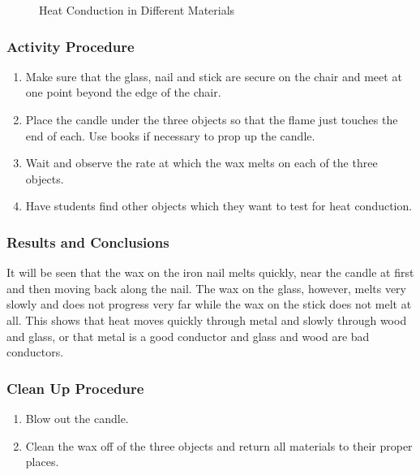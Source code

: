 \begin{figure}
\begin{center}
\def\svgwidth{150pt}

\caption{Heat Conduction in Different Materials}
\label{fig:heat-conduction}
\end{center}
\end{figure}

\subsubsection*{Activity Procedure}
\begin{enumerate}
\item{Make sure that the glass, nail and stick are secure on the chair and meet at one point beyond the edge of the chair.} 
\item{Place the candle under the three objects so that the flame just touches the end of each. Use books if necessary to prop up the candle.} 
\item{Wait and observe the rate at which the wax melts on each of the three objects.} 
\item{Have students find other objects which they want to test for heat conduction.} 
\end{enumerate}

\subsubsection*{Results and Conclusions}
It will be seen that the wax on the iron nail melts quickly, near the candle at first and then moving back along the nail. The wax on the glass, however, melts very slowly and does not progress very far while the wax on the stick does not melt at all.  
This shows that heat moves quickly through metal and slowly through wood and glass, or that metal is a good conductor and glass and wood are bad conductors.  

\subsubsection*{Clean Up Procedure}
\begin{enumerate}
\item{Blow out the candle.} 
\item{Clean the wax off of the three objects and return all materials to their proper places.} 
\end{enumerate}

